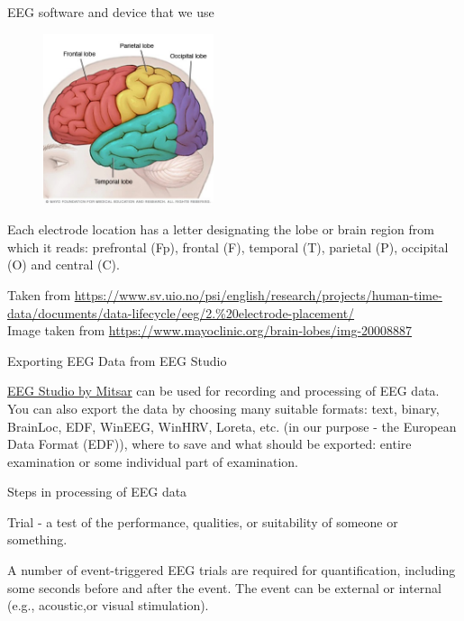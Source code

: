 \documentclass{beamer}
\begin{document}
\begin{frame}
{\centerline{EEG software and device that we use}}
\begin{figure}
    \centering
    \includegraphics[height=5cm]{P2023.AIBCCSS.BrainSignals/brain_lobes.jpg}
\end{figure}
Each electrode location has a letter designating the lobe or brain region from which it reads: prefrontal (Fp), frontal (F), temporal (T), parietal (P), occipital (O) and central (C).
\begin{center}
    \tiny{Taken from \url{https://www.sv.uio.no/psi/english/research/projects/human-time-data/documents/data-lifecycle/eeg/2.\%20electrode-placement/}}\\
    \tiny{Image taken from \url{https://www.mayoclinic.org/brain-lobes/img-20008887}}
\end{center}
\end{frame}

\begin{frame}
{\centerline{Exporting EEG Data from EEG Studio}}
\href{http://www.mitsar-eeg.ru/page1.php?id=update}{EEG Studio by Mitsar} can be used for recording and processing of EEG data. You can also export the data by choosing many suitable formats: text, binary, BrainLoc, EDF, WinEEG, WinHRV, Loreta, etc. (in our purpose - the European Data Format (EDF)), where to save and what should be exported: entire examination or some individual part of examination.
\end{frame}

\begin{frame}
{\centerline{Steps in processing of EEG data}}
Trial - a test of the performance, qualities, or suitability of someone or something.

A number of event-triggered EEG trials are required for quantification, including some seconds before and after the event. The event can be external or internal (e.g., acoustic,or visual stimulation).
\end{frame}
\end{document}
